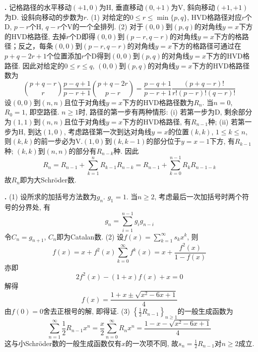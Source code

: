 \par \textbf{\thesolenum .} \cite{IC} 记格路径的水平移动$(+1,0)$为H, 垂直移动$(0, +1)$为V, 斜向移动$(+1, +1)$为D. 设斜向移动的步数为$r$. (1) 对给定的$0\le r\le \min\{p,q\}$, HVD格路径对应$r$个D, $p-r$个H, $q-r$个V的一个全排列. (2) 对于$(0,0)$到$(p,q)$的对角线$y=x$下方的HVD格路径, 去掉$r$个D即得$(0,0)$到$(p-r,q-r)$的对角线$y=x$下方的格路径；反之，每条$(0,0)$到$(p-r,q-r)$的对角线$y=x$下方的格路径可通过在$p+q-2r+1$个位置添加$r$个D得到$(0,0)$到$(p,q)$的对角线$y=x$下方的HVD格路径. 因此对给定的$0\le r\le q$, $(0,0)$到$(p,q)$的对角线$y=x$下方的HVD格路径数为
\begin{equation*}
    \binom{p+q-r}{r} \frac{p-q+1}{p-r+1}\binom{p+q-2r}{p-r} = \frac{p-q+1}{p-r+1} \frac{(p+q-r)!}{r!(p-r)!(q-r)!}
\end{equation*}
设$(0,0)$到$(n,n)$且位于对角线$y=x$下方的HVD格路径数为$R_n$. 当$n=0$, $R_0=1$, 即空路径. $n\ge 1$时, 路径的第一步有两种情形: (i) 若第一步为D, 剩余部分为$(1,1)$到$(n,n)$且位于对角线$y=x$下方的HVD格路径, 有$R_{n-1}$种; (ii) 若第一步为H, 到达$(1,0)$, 考虑路径第一次到达对角线$y=x$的位置$(k,k)$, $1\le k\le n$, 则$(k,k)$的前一步必为V.$(1,0)$到$(k,k-1)$的部分位于$y=x-1$下方, 有$R_{k-1}$种; $(k,k)$到$(n,n)$的部分有$R_{n-k}$种. 因此
\begin{equation*}
    R_n = R_{n-1} +\sum_{k=1}^{n} R_{k-1} R_{n-k} = R_{n-1} +\sum_{k=0}^{n-1} R_{k} R_{n-1-k}
\end{equation*}
故$R_n$即为大Schröder数. 



\par \textbf{\thesolenum .} \cite{IC} (1) 设所求的加括号方法数为$g_n$. $g_1=1$. 当$n\ge 2$, 考虑最后一次加括号时两个符号的分界处, 有 
\begin{equation*}
    g_n = \sum_{i=1}^{n-1} g_ig_{n-i} 
\end{equation*}
令$C_n=g_{n+1}$, $C_n$即为Catalan数. 
(2) 设$f(x)=\sum_{k=1}^\infty s_kx^k$, 则
\begin{equation*}
    f(x) = x + f^2(x) \sum_{k=0}^\infty f^k(x) = x + \frac{f^2(x)}{1-f(x)}
\end{equation*}
亦即
\begin{equation*}
    2f^2(x) - (1+x)f(x) + x = 0
\end{equation*}
解得
\begin{equation*}
    f(x) = \frac{1+x\pm \sqrt{x^2-6x+1}}{4}
\end{equation*}
由$f(0)=0$舍去正根号的解, 即得证.  
(3) $\left\{\frac{1}{2} R_{n-1}\right\}_{n\ge 1}$的一般生成函数为
\begin{equation*}
    \sum_{n=1}^\infty \frac{1}{2} R_{n-1} x^n = \frac{x}{2} \sum_{n=0}^\infty  R_n x^n =  \frac{1-x - \sqrt{x^2-6x+1}}{4}
\end{equation*}
这与小Schröder数的一般生成函数仅有$x$的一次项不同, 故$s_n = \frac{1}{2} R_{n-1}$对$n\ge 2$成立. 

